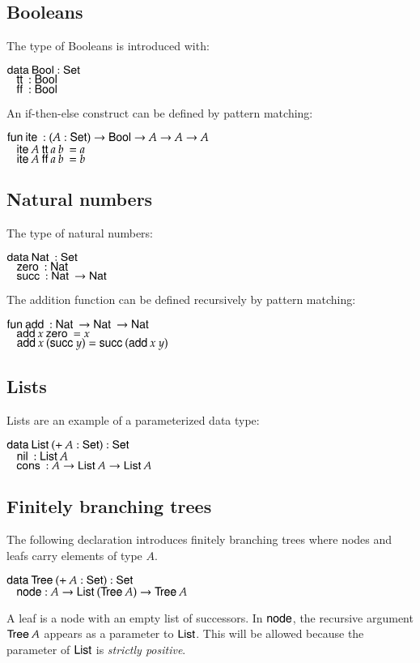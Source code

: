 \subsection{Booleans}

The type of Booleans is introduced with:
\begin{bsp}
$\mathsf{data}\: \mathsf{Bool} : \mathsf{Set}$  \\
$\hspace*{3mm} \mathsf{tt}\: : \mathsf{Bool} $\\
$\hspace*{3mm} \mathsf{ff}\: : \mathsf{Bool} $
\end{bsp}
\noindent An if-then-else construct can be defined by pattern matching:
\begin{bsp}
$\mathsf{fun}\: \mathsf{ite}\: : (A : \mathsf{Set} ) \rightarrow \mathsf{Bool} \rightarrow A \rightarrow A \rightarrow A$\\
$\hspace*{3mm} \mathsf{ite}\: A\: \mathsf{tt}\: a\: b\: = a$\\
$\hspace*{3mm} \mathsf{ite}\: A\: \mathsf{ff}\: a\: b\: = b$
\end{bsp}
\subsection{Natural numbers}
The type of natural numbers:
\begin{bsp}
$\mathsf{data}\: \mathsf{Nat}\: : \mathsf{Set}$ \\
$\hspace*{3mm} \mathsf{zero}\: : \mathsf{Nat}\: $\\
$\hspace*{3mm} \mathsf{succ}\: : \mathsf{Nat}\: \rightarrow \mathsf{Nat}\:$
\end{bsp}

\noindent The addition function can be defined recursively by pattern matching:
\begin{bsp}
$\mathsf{fun}\: \mathsf{add}\: : \mathsf{Nat}\: \rightarrow \mathsf{Nat}\: \rightarrow \mathsf{Nat}\:$\\
$\hspace*{3mm} \mathsf{add}\: x \: \mathsf{zero}\: = x $\\
$\hspace*{3mm} \mathsf{add}\: x \: (\mathsf{succ}\: y) = \mathsf{succ}\: (\mathsf{add}\: x \: y)  $
\end{bsp}
\subsection{Lists}
Lists are an example of a parameterized data type:
\begin{bsp}
$\mathsf{data}\: \mathsf{List}\: ( + \: A : \mathsf{Set} ) : \mathsf{Set} $ \\
$ \hspace*{3mm} \mathsf{nil}\: : \mathsf{List}\: A  $\\
$ \hspace*{3mm} \mathsf{cons}\: : A \rightarrow \mathsf{List}\: A \rightarrow \mathsf{List}\: A $
\end{bsp}
\subsection{Finitely branching trees}
\label{tre}
The following declaration introduces finitely branching trees where nodes and leafs carry elements of type $A$.
\begin{bsp}
$\mathsf{data}\: \mathsf{Tree}\: ( + \: A : \mathsf{Set} ) : \mathsf{Set} $ \\
$ \hspace*{3mm} \mathsf{node} : A \rightarrow \mathsf{List}\: (\mathsf{Tree}\: A ) \rightarrow \mathsf{Tree}\: A  $
\end{bsp}
A leaf is a node with an empty list of successors. 
In $\mathsf{node}$, the recursive argument $\mathsf{Tree}\: A$ appears as a parameter to $\mathsf{List}$.
This will be allowed because the parameter of $\mathsf{List}$ is \emph{strictly positive}.
